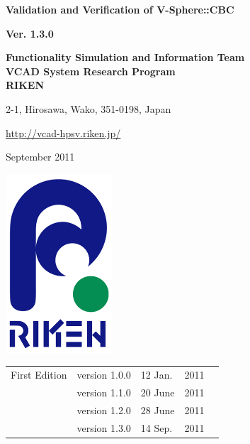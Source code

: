 \documentclass[a4paper,10pt,oneside,fleqn]{jsbook}
\begin{document}
\begin{titlepage}
\begin{center}
\vspace*{3cm}
{\huge \textbf{Validation and Verification of V-Sphere::CBC}}\\
\vspace{1cm}

{\large \textbf{Ver. 1.3.0}}\\
\vspace{1.5cm}

{\large \textbf{Functionality Simulation and Information Team}\\
\large \textbf{VCAD System Research Program}\\
\large \textbf{RIKEN}\\
\vspace{1cm}
}

{\large 2-1, Hirosawa, Wako, 351-0198, Japan}\\
\vspace{0.5cm}

\url{http://vcad-hpsv.riken.jp/}\\
\vspace{1cm}

September 2011\\
\vspace{4cm}

\includegraphics[width=4cm,bb=-80 0 220 500]{RIKEN_logo_300x500.png}

\end{center}
\end{titlepage}
\newpage

%
\frontmatter

\begin{tabular}{llllr}
First Edition  &  version 1.0.0  & 12 Jan.  & 2011\\
               &  version 1.1.0  & 20 June  & 2011\\
               &  version 1.2.0  & 28 June  & 2011\\
               &  version 1.3.0  & 14 Sep.  & 2011

\end{tabular}
\end{document}
